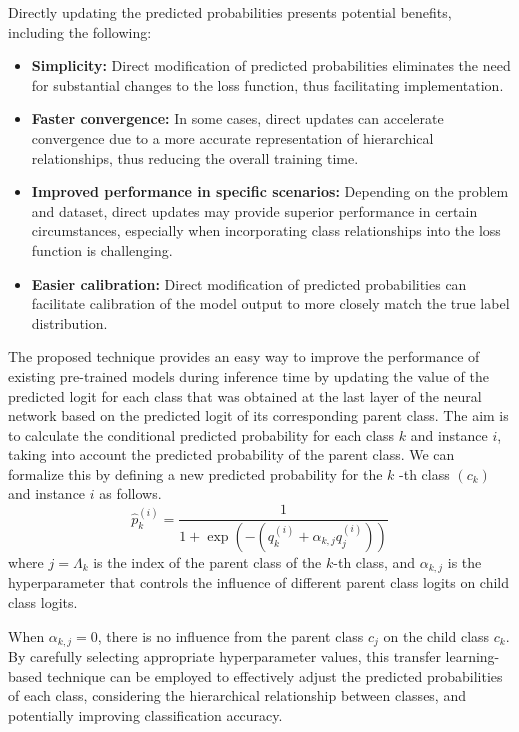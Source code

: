 Directly updating the predicted probabilities presents potential benefits, including the following:
\begin{itemize}
    \item  \textbf{Simplicity:} Direct modification of predicted probabilities eliminates the need for substantial changes to the loss function, thus facilitating implementation.
    \item  \textbf{Faster convergence:} In some cases, direct updates can accelerate convergence due to a more accurate representation of hierarchical relationships, thus reducing the overall training time.
    \item  \textbf{Improved performance in specific scenarios:} Depending on the problem and dataset, direct updates may provide superior performance in certain circumstances, especially when incorporating class relationships into the loss function is challenging.
    \item  \textbf{Easier calibration:} Direct modification of predicted probabilities can facilitate calibration of the model output to more closely match the true label distribution.
\end{itemize}

The proposed technique provides an easy way to improve the performance of existing pre-trained models during inference time by updating the value of the predicted logit for each class that was obtained at the last layer of the neural network based on the predicted logit of its corresponding parent class. The aim is to calculate the conditional predicted probability for each class $k $ and instance $i $, taking into account the predicted probability of the parent class. We can formalize this by defining a new predicted probability for the $k $ -th class $(c_k) $ and instance $i $ as follows.
\begin{equation}
    \widehat{p}_k^{(i)} = \frac{1}{ 1 + \exp \left(-\left(q_k^{(i)} + \alpha_{k,j} q_j^{(i)} \right)\right) }
    \label{eq:taxonomy.eq.1.pred.approach1}
\end{equation}
where $j=\Lambda_k$ is the index of the parent class of the $k$-th class, and $\alpha_{k,j} $ is the hyperparameter that controls the influence of different parent class logits on child class logits.

When $\alpha_{k,j}=0 $, there is no influence from the parent class $c_j$ on the child class $c_k$.  By carefully selecting appropriate hyperparameter values, this transfer learning-based technique can be employed to effectively adjust the predicted probabilities of each class, considering the hierarchical relationship between classes, and potentially improving classification accuracy.

